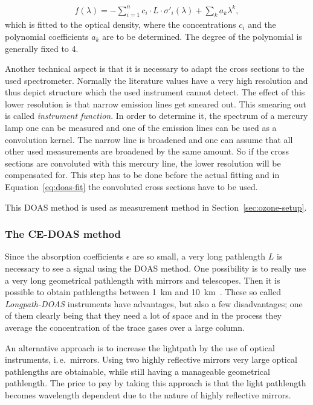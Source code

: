 \begin{align}
  f(\lambda) = - \sum_{i=1}^n c_i \cdot L \cdot \sigma'_i(\lambda) +
  \sum_k a_k \lambda^k \label{eq:doas-fit},
\end{align}
which is fitted to the optical density, where the concentrations $c_i$
and the polynomial coefficients $a_k$ are to be determined. The degree
of the polynomial is generally fixed to \num{4}.

Another technical aspect is that it is necessary to adapt the cross
sections to the used spectrometer. Normally the literature values have
a very high resolution and thus depict structure which the used
instrument cannot detect. The effect of this lower resolution is that
narrow emission lines get smeared out. This smearing out is called
\emph{instrument function}. In order to determine it, the spectrum of
a mercury lamp one can be measured and one of the emission lines can
be used as a convolution kernel. The narrow line is broadened and one
can assume that all other used measurements are broadened by the same
amount. So if the cross sections are convoluted with this mercury
line, the lower resolution will be compensated for. This step has to
be done before the actual fitting and in Equation~\eqref{eq:doas-fit}
the convoluted cross sections have to be used.

This DOAS method is used as measurement method in
Section~\ref{sec:ozone-setup}. 

\subsubsection{The CE-DOAS method}
\label{sec:ce-doas}

Since the absorption coefficients $\epsilon$ are so small, a very long
pathlength $L$ is necessary to see a signal using the DOAS method. One
possibility is to really use a very long geometrical pathlength with
mirrors and telescopes. Then it is possible to obtain pathlengths
between \SI{1}{\kilo\meter} and
\SI{10}{\kilo\meter}~\cite{platt}. These so called
\emph{Longpath-DOAS} instruments have advantages, but also a few
disadvantages; one of them clearly being that they need a lot of space
and in the process they average the concentration of the trace gases
over a large column.

An alternative approach is to increase the lightpath by the use of
optical instruments, i.\,e.\ mirrors. Using two highly reflective
mirrors very large optical pathlengths are obtainable, while still
having a manageable geometrical pathlength. The price to pay by
taking this approach is that the light pathlength becomes
wavelength dependent due to the nature of highly reflective mirrors.

